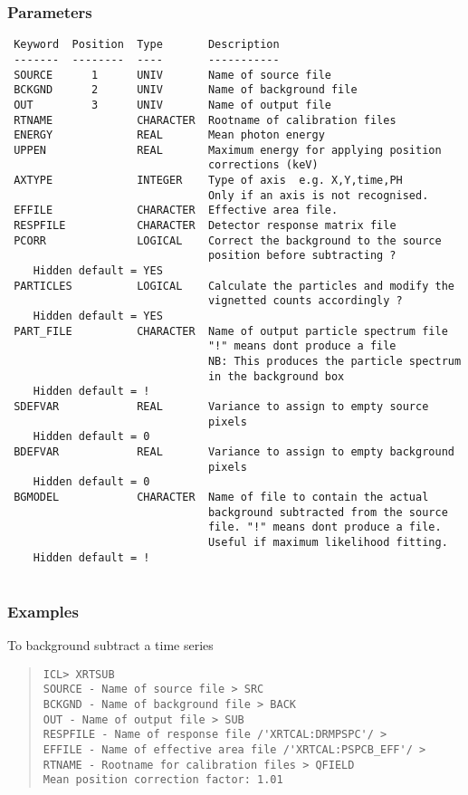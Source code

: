 \documentclass{book}
\renewcommand{\_}{{\tt\char'137}}     %
\begin{document}
\subsubsection{Parameters}
\begin{verbatim}
 Keyword  Position  Type       Description
 -------  --------  ----       -----------
 SOURCE      1      UNIV       Name of source file
 BCKGND      2      UNIV       Name of background file
 OUT         3      UNIV       Name of output file
 RTNAME             CHARACTER  Rootname of calibration files
 ENERGY             REAL       Mean photon energy
 UPPEN              REAL       Maximum energy for applying position
                               corrections (keV)
 AXTYPE             INTEGER    Type of axis  e.g. X,Y,time,PH
                               Only if an axis is not recognised.
 EFFILE             CHARACTER  Effective area file.
 RESPFILE           CHARACTER  Detector response matrix file
 PCORR              LOGICAL    Correct the background to the source
                               position before subtracting ?
    Hidden default = YES
 PARTICLES          LOGICAL    Calculate the particles and modify the
                               vignetted counts accordingly ?
    Hidden default = YES
 PART_FILE          CHARACTER  Name of output particle spectrum file
                               "!" means dont produce a file
                               NB: This produces the particle spectrum
                               in the background box
    Hidden default = !
 SDEFVAR            REAL       Variance to assign to empty source
                               pixels
    Hidden default = 0
 BDEFVAR            REAL       Variance to assign to empty background
                               pixels
    Hidden default = 0
 BGMODEL            CHARACTER  Name of file to contain the actual
                               background subtracted from the source
                               file. "!" means dont produce a file.
                               Useful if maximum likelihood fitting.
    Hidden default = !
 
\end{verbatim}\subsubsection{Examples}
To background subtract a time series
\begin{quote}\begin{verbatim}
ICL> XRTSUB
SOURCE - Name of source file > SRC
BCKGND - Name of background file > BACK
OUT - Name of output file > SUB
RESPFILE - Name of response file /'XRTCAL:DRMPSPC'/ >
EFFILE - Name of effective area file /'XRTCAL:PSPCB_EFF'/ >
RTNAME - Rootname for calibration files > QFIELD
Mean position correction factor: 1.01
\end{verbatim}\end{quote}
\end{document}

